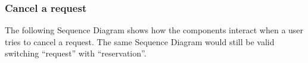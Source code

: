 \documentclass{article}
\begin{document}
\subsubsection{Cancel a request}
The following Sequence Diagram shows how the components interact when a user tries to cancel a request. The same Sequence Diagram would still be valid switching ``request'' with ``reservation''. 
\begin{figure}[H]
\end{figure}
\end{document}
